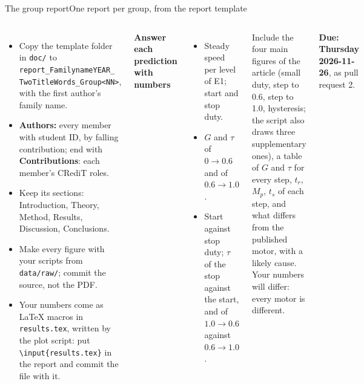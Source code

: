 \begin{frame}{The group report}{One report per group, from the report template}
  \footnotesize
  \begin{columns}[T]
    \scriptsize
    \begin{itemize}\setlength{\itemsep}{0pt}
      \item \alert{Copy the template folder} in \texttt{doc/} to\\ \texttt{report\_FamilynameYEAR\_}\\ \texttt{TwoTitleWords\_Group<NN>}, with the first author's family name.
      \item \textbf{Authors:} every member with student ID, by falling contribution; end with \textbf{Contributions}: each member's CRediT roles.
      \item Keep its sections: Introduction, Theory, Method, Results, Discussion, Conclusions.
      \item Make every figure with your scripts from \texttt{data/raw/}; commit the source, not the PDF.
      \item Your numbers come as \LaTeX{} macros in \texttt{results.tex}, written by the plot script: put \texttt{\textbackslash input\{results.tex\}} in the report and commit the file with it.
    \end{itemize}
    \scriptsize
    \textbf{Answer each prediction with numbers}
    \begin{itemize}\setlength{\itemsep}{2pt}
      \item[\textbf{P1}] Steady speed per level of E1; start and stop duty.
      \item[\textbf{P2}] $G$ and $\tau$ of $0 \to 0.6$ and of $0.6 \to 1.0$.
      \item[\textbf{P3}] Start against stop duty; $\tau$ of the stop against the start, and of $1.0 \to 0.6$ against $0.6 \to 1.0$.
    \end{itemize}
    Include the four main figures of the article (small duty, step to 0.6, step to 1.0, hysteresis; the script also draws three supplementary ones), a table of $G$ and $\tau$ for every step, $t_r$, $M_p$, $t_s$ of each step, and what differs from the published motor, with a likely cause.
    {\scriptsize Your numbers will differ: every motor is different.}

    \vspace{3pt}
    \alert{\textbf{Due: Thursday 2026-11-26}}, as pull request 2.
  \end{columns}
\end{frame}
